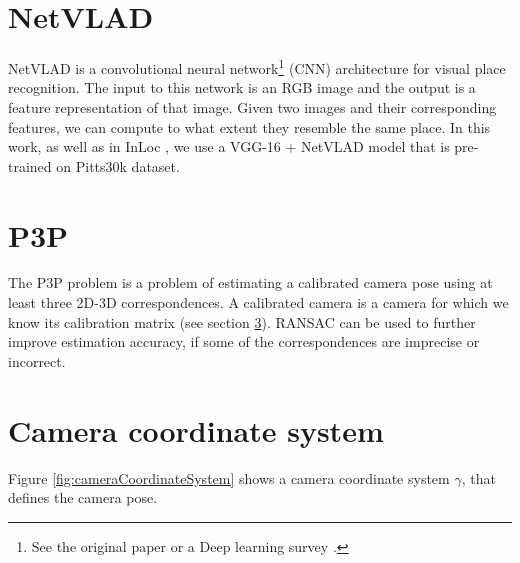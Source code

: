 \documentclass[twoside]{ctuthesis}
\theoremstyle{plain}
\theoremstyle{definition}
\theoremstyle{note}
\begin{document}
\section{NetVLAD}
\label{section:NetVLAD}
NetVLAD \cite{Arandjelovic16} is a convolutional neural network\footnote{See the original paper \cite{CNN} or a Deep learning survey \cite{DeepLearning}.} (CNN) architecture for visual place recognition. The input to this network is an RGB image and the output is a feature representation of that image. Given two images and their corresponding features, we can compute to what extent they resemble the same place. In this work, as well as in InLoc \cite{taira2018inloc}, we use a VGG-16 \cite{VGG} + NetVLAD model that is pre-trained on Pitts30k \cite{Arandjelovic16} dataset.

\section{P3P}
\label{section:P3P}
The P3P problem \cite{RANSAC} is a problem of estimating a calibrated camera pose using at least three 2D-3D correspondences. A calibrated camera is a camera for which we know its calibration matrix (see section \ref{section:cameraCS}). RANSAC \cite{RANSAC} can be used to further improve estimation accuracy, if some of the correspondences are imprecise or incorrect.

\section{Camera coordinate system}
\label{section:cameraCS}

Figure \ref{fig:cameraCoordinateSystem} shows a camera coordinate system $\gamma$, that defines the camera pose.
\end{document}
